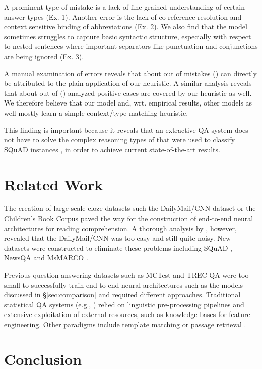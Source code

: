 \documentclass[11pt,a4paper]{article}
\begin{document}
A prominent type of mistake is a lack of fine-grained understanding of certain answer types (Ex. 1). Another error is the lack of co-reference resolution and context sensitive binding of abbreviations (Ex. 2). We also find that the model sometimes struggles to capture basic syntactic structure, especially with respect to nested sentences where important separators like punctuation and conjunctions are being ignored (Ex. 3).

A manual examination of errors reveals that about  out of  mistakes () can directly be attributed to the plain application of our heuristic. A similar analysis reveals that about  out of  () analyzed positive cases are covered by our heuristic as well. We therefore believe that our model and, wrt. empirical results, other models as well mostly learn a simple context/type matching heuristic. 

This finding is important because it reveals that an extractive QA system does not have to solve the complex reasoning types of  that were used to classify SQuAD instances \cite{Rajpurkar2016}, in order to achieve current state-of-the-art results.

\section{Related Work}

The creation of large scale cloze datasets such the DailyMail/CNN dataset \cite{Hermann2015} or the Children's Book Corpus \cite{Hill2016} paved the way for the construction of end-to-end neural architectures for reading comprehension. A thorough analysis by , however, revealed that the DailyMail/CNN was too easy and still quite noisy. New datasets were constructed to eliminate these problems including SQuAD \cite{Rajpurkar2016}, NewsQA \cite{Trischler2017} and MsMARCO \cite{Nguyen2016}.

Previous question answering datasets such as MCTest \cite{Richardson2013} and TREC-QA \cite{Dang2007} were too small to successfully train end-to-end neural architectures such as the models discussed in \S\ref{sec:comparison} and required different approaches. Traditional statistical QA systems (e.g., ) relied on linguistic pre-processing pipelines and extensive exploitation of external resources, such as knowledge bases for feature-engineering. Other paradigms include template matching or passage retrieval \cite{Andrenucci2005}.

\section{Conclusion}
\end{document}
